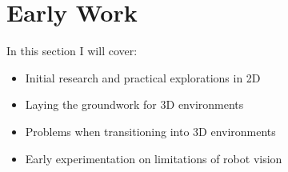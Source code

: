 \chapter{Early Work}
In this section I will cover:
  \begin{itemize}
    \item Initial research and practical explorations in 2D 
    \item Laying the groundwork for 3D environments
    \item Problems when transitioning into 3D environments
    \item Early experimentation on limitations of robot vision
  \end{itemize}



